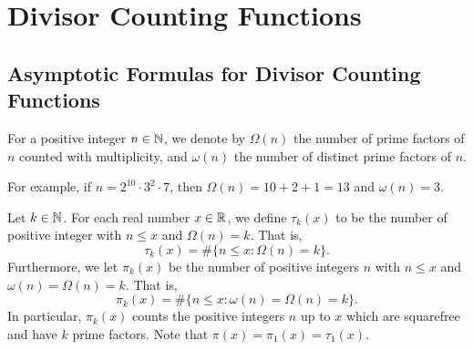 \section{Divisor Counting Functions}\label{sec:4}

\subsection{Asymptotic Formulas for Divisor Counting Functions}\label{subsec:4.1}

\begin{defn}\label{def:4.1}
    For a positive integer $n \in \mathbb{N}$, we denote by $\Omega(n)$ the number 
    of prime factors of $n$ counted with multiplicity, and $\omega(n)$ the 
    number of distinct prime factors of $n$. 
\end{defn}

For example, if $n = 2^{10} \cdot 3^2 \cdot 7$, then $\Omega(n) = 10 + 2 + 1
= 13$ and $\omega(n) = 3$. 

\begin{defn}\label{def:4.2}
    Let $k \in \mathbb{N}$. For each real number $x \in \mathbb{R}$, we define $\tau_k(x)$ 
    to be the number of positive integer with $n \leq x$ and $\Omega(n) = k$. 
    That is, 
    \[ \tau_k(x) = \#\{n \leq x : \Omega(n) = k\}. \] 
    Furthermore, we let $\pi_k(x)$ be the number of positive integers 
    $n$ with $n \leq x$ and $\omega(n) = \Omega(n) = k$. That is, 
    \[ \pi_k(x) = \#\{n \leq x : \omega(n) = \Omega(n) = k\}. \] 
    In particular, $\pi_k(x)$ counts the positive integers $n$ up to $x$ 
    which are squarefree and have $k$ prime factors. Note that 
    $\pi(x) = \pi_1(x) = \tau_1(x)$. 
\end{defn}

